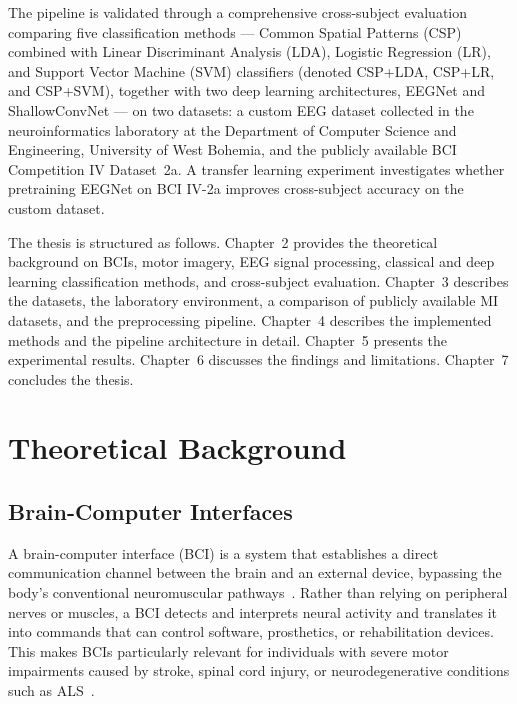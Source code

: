 \documentclass[english, bc, kiv, he, iso690alph, pdf]{fasthesis}
\begin{document}
The pipeline is validated through a comprehensive cross-subject evaluation comparing five classification methods --- Common Spatial Patterns (CSP) combined with Linear Discriminant Analysis (LDA), Logistic Regression (LR), and Support Vector Machine (SVM) classifiers (denoted CSP+LDA, CSP+LR, and CSP+SVM), together with two deep learning architectures, EEGNet and ShallowConvNet --- on two datasets: a custom EEG dataset collected in the neuroinformatics laboratory at the Department of Computer Science and Engineering, University of West Bohemia, and the publicly available BCI Competition IV Dataset~2a. A transfer learning experiment investigates whether pretraining EEGNet on BCI IV-2a improves cross-subject accuracy on the custom dataset.

The thesis is structured as follows. Chapter~2 provides the theoretical background on BCIs, motor imagery, EEG signal processing, classical and deep learning classification methods, and cross-subject evaluation. Chapter~3 describes the datasets, the laboratory environment, a comparison of publicly available MI datasets, and the preprocessing pipeline. Chapter~4 describes the implemented methods and the pipeline architecture in detail. Chapter~5 presents the experimental results. Chapter~6 discusses the findings and limitations. Chapter~7 concludes the thesis.

\chapter{Theoretical Background}

\section{Brain-Computer Interfaces}

A brain-computer interface (BCI) is a system that establishes a direct communication channel between the brain and an external device, bypassing the body's conventional neuromuscular pathways~\cite{wolpaw2002brain}. Rather than relying on peripheral nerves or muscles, a BCI detects and interprets neural activity and translates it into commands that can control software, prosthetics, or rehabilitation devices. This makes BCIs particularly relevant for individuals with severe motor impairments caused by stroke, spinal cord injury, or neurodegenerative conditions such as ALS~\cite{yadav2025decoding}.
\end{document}
